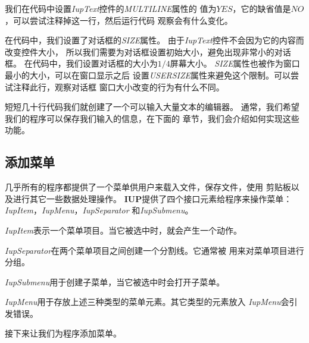 \documentclass{ctexart}
\begin{document}
我们在代码中设置\emph{IupText}控件的\emph{MULTILINE}属性的
值为$YES$，它的缺省值是$NO$，可以尝试注释掉这一行，然后运行代码
观察会有什么变化。

在代码中，我们设置了对话框的\emph{SIZE}属性。
由于\emph{IupText}控件不会因为它的内容而改变控件大小，
所以我们需要为对话框设置初始大小，避免出现非常小的对话框。
在代码中，我们设置对话框的大小为$1/4$屏幕大小。
\emph{SIZE}属性也被作为窗口最小的大小，可以在窗口显示之后
设置\emph{USERSIZE}属性来避免这个限制。可以尝试注释此行，观察对话框
窗口大小改变的行为有什么不同。

短短几十行代码我们就创建了一个可以输入大量文本的编辑器。
通常，我们希望我们的程序可以保存我们输入的信息，在下面的
章节，我们会介绍如何实现这些功能。

\subsection{添加菜单}

几乎所有的程序都提供了一个菜单供用户来载入文件，保存文件，使用
剪贴板以及进行其它一些数据处理操作。
\textbf{IUP}提供了四个接口元素给程序来操作菜单：
\emph{IupItem}，\emph{IupMenu}，\emph{IupSeparator}
和\emph{IupSubmenu}。

\emph{IupItem}表示一个菜单项目。当它被选中时，就会产生一个动作。

\emph{IupSeparator}在两个菜单项目之间创建一个分割线。它通常被
用来对菜单项目进行分组。

\emph{IupSubmenu}用于创建子菜单，当它被选中时会打开子菜单。

\emph{IupMenu}用于存放上述三种类型的菜单元素。其它类型的元素放入
\emph{IupMenu}会引发错误。

接下来让我们为程序添加菜单。
\end{document}

